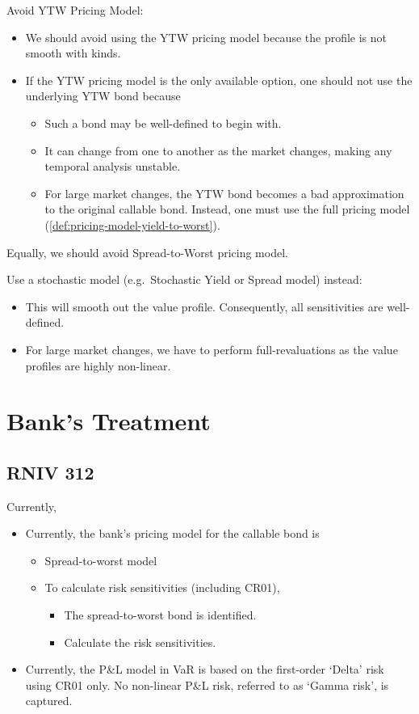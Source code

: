 \documentclass[10pt,a4paper]{article}
\begin{document}
Avoid YTW Pricing Model:
\begin{itemize}
	\item We should avoid using the YTW pricing model because the profile is not smooth with kinds.
	\item If the YTW pricing model is the only available option, one should not use the underlying YTW bond because
	\begin{itemize}
		\item Such a bond may be well-defined to begin with. 
		\item It can change from one to another as the market changes, making any temporal analysis unstable. 
		\item For large market changes, the YTW bond becomes a bad approximation to the original callable bond. Instead, one must use the full pricing model (\ref{def:pricing-model-yield-to-worst}). 
	\end{itemize}	
\end{itemize}
Equally, we should avoid Spread-to-Worst pricing model. 


Use a stochastic model (e.g.\ Stochastic Yield or Spread model) instead:
\begin{itemize}
	\item This will smooth out the value profile. Consequently, all sensitivities are well-defined. 
	\item For large market changes, we have to perform full-revaluations as the value profiles are highly non-linear.  
\end{itemize}

\section{Bank's Treatment}

\subsection{RNIV 312}

Currently, 
\begin{itemize}
	\item Currently, the bank's pricing model for the callable bond is 
	\begin{itemize}
		\item Spread-to-worst model
		\item To calculate risk sensitivities (including CR01), 
		\begin{itemize}
			\item The spread-to-worst bond is identified.
			\item Calculate the risk sensitivities. 
		\end{itemize}
	\end{itemize}
	\item Currently, the P\&L model in VaR is based on the first-order `Delta' risk using CR01 only. No non-linear P\&L risk, referred to as `Gamma risk', is captured. 
\end{itemize}
\end{document}
